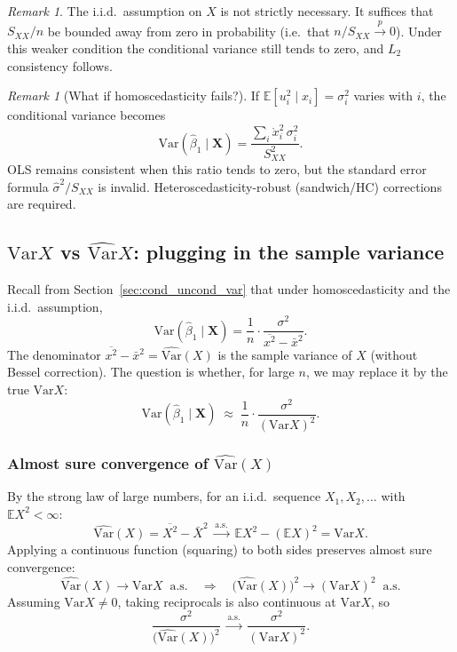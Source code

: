 \documentclass[a4paper,oneside,12pt]{extarticle}
\theoremstyle{plain}
\theoremstyle{definition}
\theoremstyle{remark}
\newtheorem{remark}[proposition]{Remark}
\newcommand*{\E}{\mathbb{E}}
\newcommand*{\Var}{\mathrm{Var}}
\begin{document}
\begin{remark}
The i.i.d.\ assumption on $X$ is not strictly necessary.  It suffices
that $S_{XX}/n$ be bounded away from zero in probability (i.e.\ that
$n/S_{XX} \xrightarrow{p} 0$).  Under this weaker condition the
conditional variance still tends to zero, and $L_2$ consistency follows.
\end{remark}

\begin{remark}[What if homoscedasticity fails?]
If $\E[u_i^2\mid x_i]=\sigma_i^2$ varies with $i$, the conditional
variance becomes
\[
  \Var(\hat\beta_1\mid\mathbf{X})
  = \frac{\sum_i\mathring{x}_i^2\,\sigma_i^2}{S_{XX}^2}.
\]
OLS remains consistent when this ratio tends to zero, but the standard
error formula $\hat\sigma^2/S_{XX}$ is invalid.  Heteroscedasticity-robust
(sandwich/HC) corrections are required.
\end{remark}

\subsection{\texorpdfstring{$\Var X$ vs $\widehat{\Var} X$}%
            {Var X vs VarHat X}: plugging in the sample variance}
\label{sec:varx_varhatx}

Recall from Section~\ref{sec:cond_uncond_var} that under homoscedasticity
and the i.i.d.\ assumption,
\[
  \Var(\hat\beta_1 \mid \mathbf{X})
  = \frac{1}{n}\cdot\frac{\sigma^2}{\overline{x^2}-\bar x^2}.
\]
The denominator $\overline{x^2}-\bar x^2 = \widehat{\Var}(X)$ is the
sample variance of $X$ (without Bessel correction).  The question is
whether, for large $n$, we may replace it by the true $\Var X$:
\[
  \Var(\hat\beta_1 \mid \mathbf{X})
  \;\approx\;
  \frac{1}{n}\cdot\frac{\sigma^2}{(\Var X)^2}.
\]

\subsubsection{Almost sure convergence of \texorpdfstring{$\widehat{\Var}(X)$}{VarHat X}}

By the strong law of large numbers, for an i.i.d.\ sequence $X_1,X_2,\ldots$
with $\E X^2 < \infty$:
\[
  \widehat{\Var}(X) = \overline{X^2} - \bar X^2
  \;\xrightarrow{\mathrm{a.s.}}\;
  \E X^2 - (\E X)^2 = \Var X.
\]
Applying a continuous function (squaring) to both sides preserves almost
sure convergence:
\[
  \widehat{\Var}(X) \to \Var X \;\;\mathrm{a.s.}
  \quad\Longrightarrow\quad
  \bigl(\widehat{\Var}(X)\bigr)^2 \to (\Var X)^2 \;\;\mathrm{a.s.}
\]
Assuming $\Var X \neq 0$, taking reciprocals is also continuous at
$\Var X$, so
\[
  \frac{\sigma^2}{\bigl(\widehat{\Var}(X)\bigr)^2}
  \;\xrightarrow{\mathrm{a.s.}}\;
  \frac{\sigma^2}{(\Var X)^2}.
\]
\end{document}
